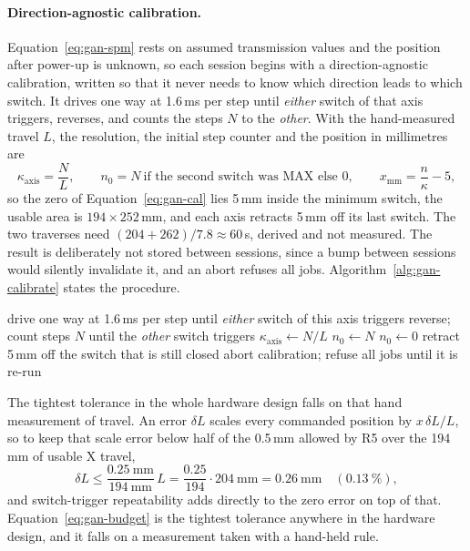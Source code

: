 \paragraph{Direction-agnostic calibration.}
\label{sec:gan-calib}
Equation~\ref{eq:gan-spm} rests on assumed transmission values and the position after power-up is unknown, so each session begins with a direction-agnostic calibration, written so that it never needs to know which direction leads to which switch. It drives one way at 1.6\,ms per step until \emph{either} switch of that axis triggers, reverses, and counts the steps $N$ to the \emph{other}. With the hand-measured travel $L$, the resolution, the initial step counter and the position in millimetres are
\begin{equation}
\kappa_{\mathrm{axis}}=\frac{N}{L},\qquad n_0=N\ \text{if the second switch was MAX else }0,\qquad x_{\mathrm{mm}}=\frac{n}{\kappa}-5,
\label{eq:gan-cal}
\end{equation}
so the zero of Equation~\ref{eq:gan-cal} lies 5\,mm inside the minimum switch, the usable area is $194\times252$\,mm, and each axis retracts 5\,mm off its last switch. The two traverses need $(204+262)/7.8\approx60$\,s, derived and not measured. The result is deliberately not stored between sessions, since a bump between sessions would silently invalidate it, and an abort refuses all jobs. Algorithm~\ref{alg:gan-calibrate} states the procedure.

\begin{algorithm}[!htbp]
\caption{Direction-agnostic calibration of one axis}
\label{alg:gan-calibrate}
\begin{algorithmic}[1]
\STATE drive one way at 1.6\,ms per step until \emph{either} switch of this axis triggers
\STATE reverse; count steps $N$ until the \emph{other} switch triggers
\STATE $\kappa_{\mathrm{axis}}\leftarrow N/L$ 
    \STATE $n_0\leftarrow N$
\ELSE
    \STATE $n_0\leftarrow0$
\ENDIF
\STATE retract 5\,mm off the switch that is still closed
    \STATE abort calibration; refuse all jobs until it is re-run
\ENDIF
\end{algorithmic}
\end{algorithm}

The tightest tolerance in the whole hardware design falls on that hand measurement of travel. An error $\delta L$ scales every commanded position by $x\,\delta L/L$, so to keep that scale error below half of the 0.5\,mm allowed by R5 over the 194\,mm of usable X travel,
\begin{equation}
\delta L\le\frac{0.25\ \mathrm{mm}}{194\ \mathrm{mm}}\,L=\frac{0.25}{194}\cdot204\ \mathrm{mm}=0.26\ \mathrm{mm}\quad(0.13\ \%),
\label{eq:gan-budget}
\end{equation}
and switch-trigger repeatability adds directly to the zero error on top of that. Equation~\ref{eq:gan-budget} is the tightest tolerance anywhere in the hardware design, and it falls on a measurement taken with a hand-held rule.


